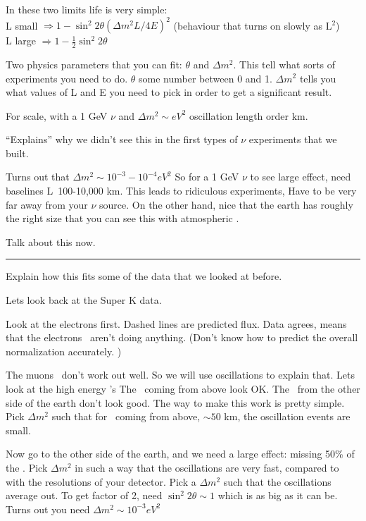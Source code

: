 {In these two limits life is very simple:\\
L small  $\Rightarrow 1 - \sin^2 2\theta \left(\Delta m^2 L/4E\right)^2$  (behaviour that turns on slowly as L$^2$)\\
L large  $\Rightarrow 1 - \frac{1}{2}\sin^2 2\theta $  

Two physics parameters that you can fit: $\theta$ and  $\Delta m^2$.
This tell what sorts of experiments you need to do.
$\theta$ some number between 0 and 1. 
$\Delta m^2$ tells you what values of L and E you need to pick in order to get a significant result.

For scale, with a 1 GeV $\nu$ and $\Delta m^2 \sim eV^2$ oscillation length order km. 

``Explains'' why we didn't see this in the first types of $\nu$ experiments that we built.  


Turns out that $\Delta m^2 \sim 10^{-3}-10^{-4}eV^2$
So for a 1 GeV $\nu$ to see large effect, need baselines L~100-10,000 km.  
This leads to ridiculous experiments, Have to be very far away from your $\nu$ source.  
On the other hand, nice that the earth has roughly the right size that you can see this with atmospheric \nus. 

Talk about this now. 

\noindent\rule{\textwidth}{1pt}

Explain how this fits some of the data that we looked at before.

Lets look back at the Super K data. 

Look at the electrons first.
Dashed lines are predicted flux. 
Data agrees, means that the electrons \nus\ aren't doing anything.
(Don't know how to predict the overall normalization accurately. )

The muons \nus\ don't work out well. 
So we will use oscillations to explain that.
Lets look at the high energy \numu's
The \nus\ coming from above look OK. 
The \nus\ from the other side of the earth don't look good. 
The way to make this work is pretty simple. 
Pick $\Delta m^2$ such that for \nus\ coming from above, $\sim50$ km, the oscillation events are small. 

Now go to the other side of the earth, and we need a large effect: missing 50\% of the \nus.
Pick $\Delta m^2$ in such a way that the oscillations are very fast, compared to with the resolutions of your detector. 
Pick a $\Delta m^2$ such that the oscillations average out.
To get factor of 2, need $\sin^2 2\theta \sim 1 $ which is as big as it can be. 
Turns out you need $\Delta m^2 \sim 10^{-3} eV^2$


}
